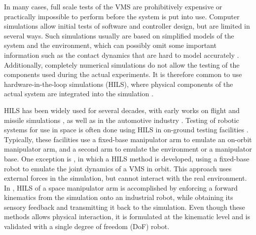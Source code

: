 \documentclass[../main.tex]{subfiles}
\begin{document}
In many cases, full scale tests of the VMS are prohibitively expensive or practically impossible to perform before the system is put into use. Computer simulations allow initial tests of software and controller design, but are limited in several ways. Such simulations usually are based on simplified models of the system and the environment, which can possibly omit some important information such as the contact dynamics that are hard to model accurately \cite{skrinjar2018}. Additionally, completely numerical simulations do not allow the testing of the components used during the actual experiments. It is therefore common to use hardware-in-the-loop simulations (HILS), where physical components of the actual system are integrated into the simulation \cite{bacic2005, kiesbye2019hardware}. 

HILS has been widely used for several decades, with early works on flight and missile simulations \cite{bacic2005, jung2007modeling}, as well as in the automotive industry \cite{fathy2006}. Testing of robotic systems for use in space is often done using HILS in on-ground testing facilities \cite{piedboeuf1999, artigas2015, mou2018}. Typically, these facilities use a fixed-base manipulator arm to emulate an on-orbit manipulator arm, and a second arm to emulate the environment or a manipulator base. One exception is \cite{mishra2020}, in which a HILS method is developed, using a fixed-base robot to emulate the joint dynamics of a VMS in orbit. This approach uses external forces in the simulation, but cannot interact with the real environment. In \cite{krenn1999limitations}, HILS of a space manipulator arm is accomplished by enforcing a forward kinematics from the simulation onto an industrial robot, while obtaining its sensory feedback and transmitting it back to the simulation. Even though these methods allows physical interaction, it is formulated at the  kinematic level and is validated with a single degree of freedom (DoF) robot. 

\end{document}
